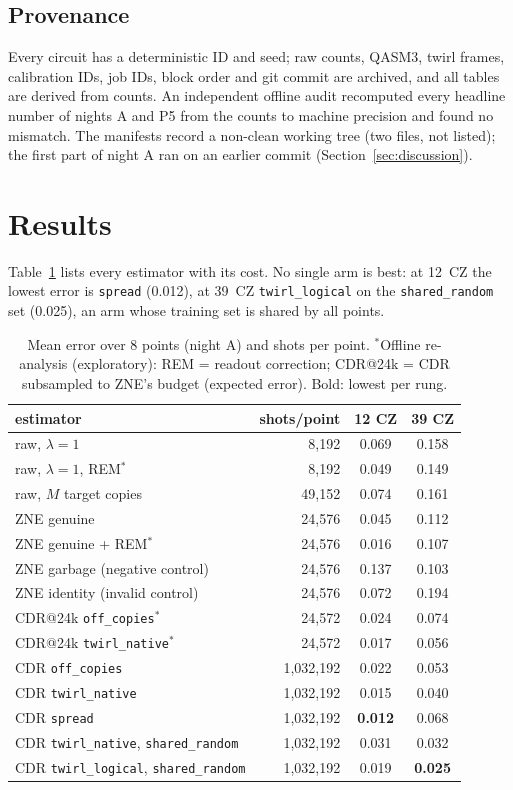 \documentclass[conference]{IEEEtran}
\newcommand{\arm}[1]{\texttt{#1}}
\begin{document}
\subsection{Provenance}
Every circuit has a deterministic ID and seed; raw counts, QASM3, twirl frames, calibration IDs,
job IDs, block order and git commit are archived, and all tables are derived from counts. An
independent offline audit recomputed every headline number of nights A and P5 from the counts
to machine precision and found no mismatch. The manifests record a non-clean working tree
(two files, not listed); the first part of night A ran on an earlier commit
(Section~\ref{sec:discussion}).

\section{Results}\label{sec:results}

Table~\ref{tab:main} lists every estimator with its cost. No single arm is best: at 12~CZ the
lowest error is \arm{spread} (0.012), at 39~CZ \arm{twirl\_logical} on the \arm{shared\_random}
set (0.025), an arm whose training set is shared by all points.

\begin{table}[t]
\caption{Mean error over 8 points (night A) and shots per point. $^\ast$Offline re-analysis
(exploratory): REM = readout correction; CDR@24k = CDR subsampled to ZNE's budget (expected
error). Bold: lowest per rung.}
\label{tab:main}
\centering\footnotesize
\setlength{\tabcolsep}{4pt}
\begin{tabular}{@{}lrcc@{}}
\toprule
estimator & shots/point & 12 CZ & 39 CZ \\
\midrule
raw, $\lambda=1$ & 8,192 & 0.069 & 0.158 \\
raw, $\lambda=1$, REM$^\ast$ & 8,192 & 0.049 & 0.149 \\
raw, $M$ target copies & 49,152 & 0.074 & 0.161 \\
ZNE genuine & 24,576 & 0.045 & 0.112 \\
ZNE genuine + REM$^\ast$ & 24,576 & 0.016 & 0.107 \\
ZNE garbage (negative control) & 24,576 & 0.137 & 0.103 \\
ZNE identity (invalid control) & 24,576 & 0.072 & 0.194 \\
CDR@24k \arm{off\_copies}$^\ast$ & 24,572 & 0.024 & 0.074 \\
CDR@24k \arm{twirl\_native}$^\ast$ & 24,572 & 0.017 & 0.056 \\
CDR \arm{off\_copies} & 1,032,192 & 0.022 & 0.053 \\
CDR \arm{twirl\_native} & 1,032,192 & 0.015 & 0.040 \\
CDR \arm{spread} & 1,032,192 & \textbf{0.012} & 0.068 \\
CDR \arm{twirl\_native}, \arm{shared\_random} & 1,032,192 & 0.031 & 0.032 \\
CDR \arm{twirl\_logical}, \arm{shared\_random} & 1,032,192 & 0.019 & \textbf{0.025} \\
\bottomrule
\end{tabular}
\end{table}
\end{document}
